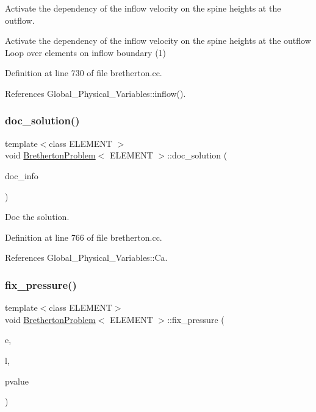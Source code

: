 Activate the dependency of the inflow velocity on the spine heights at the outflow. 

Activate the dependency of the inflow velocity on the spine heights at the outflow Loop over elements on inflow boundary (1) 

Definition at line 730 of file bretherton.\+cc.



References Global\+\_\+\+Physical\+\_\+\+Variables\+::inflow().

\mbox{\label{classBrethertonProblem_ab6e29ecf0dbffabd4ce897203d35626e}} 
\subsubsection{\texorpdfstring{doc\+\_\+solution()}{doc\_solution()}}
{\footnotesize\ttfamily template$<$class E\+L\+E\+M\+E\+NT $>$ \\
void \hyperlink{classBrethertonProblem}{Bretherton\+Problem}$<$ E\+L\+E\+M\+E\+NT $>$\+::doc\+\_\+solution (\begin{DoxyParamCaption}\item[{Doc\+Info \&}]{doc\+\_\+info }\end{DoxyParamCaption})}



Doc the solution. 



Definition at line 766 of file bretherton.\+cc.



References Global\+\_\+\+Physical\+\_\+\+Variables\+::\+Ca.

\mbox{\label{classBrethertonProblem_aa4c346d4dc8d7d24147076d281d181e9}} 
\subsubsection{\texorpdfstring{fix\+\_\+pressure()}{fix\_pressure()}}
{\footnotesize\ttfamily template$<$class E\+L\+E\+M\+E\+NT$>$ \\
void \hyperlink{classBrethertonProblem}{Bretherton\+Problem}$<$ E\+L\+E\+M\+E\+NT $>$\+::fix\+\_\+pressure (\begin{DoxyParamCaption}\item[{const unsigned \&}]{e,  }\item[{const unsigned \&}]{l,  }\item[{const double \&}]{pvalue }\end{DoxyParamCaption})\hspace{0.3cm}{\ttfamily [inline]}}




